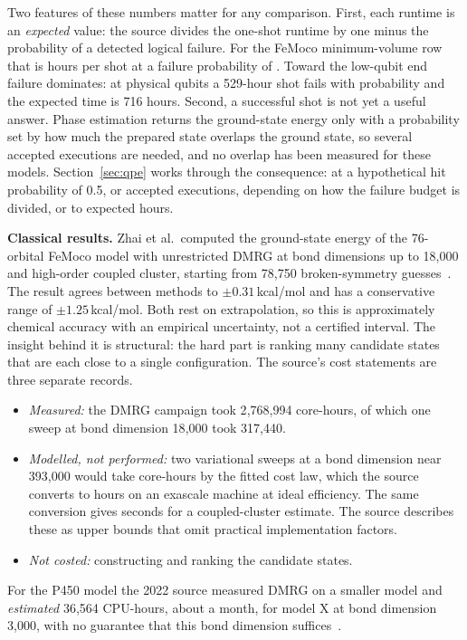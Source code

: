 

Two features of these numbers matter for any comparison. First, each runtime is an \emph{expected} value: the source divides the one-shot runtime by one minus the probability of a detected logical failure. For the FeMoco minimum-volume row that is \femoShot{} hours per shot at a failure probability of \femoPfail. Toward the low-qubit end failure dominates: at \femoSevLowQ{} physical qubits a 529-hour shot fails with probability \femoLowPfail{} and the expected time is 716 hours. Second, a successful shot is not yet a useful answer. Phase estimation returns the ground-state energy only with a probability set by how much the prepared state overlaps the ground state, so several accepted executions are needed, and no overlap has been measured for these models. Section~\ref{sec:qpe} works through the consequence: at a hypothetical hit probability of 0.5, \repAttempts{} or \repAttemptsSplit{} accepted executions, depending on how the failure budget is divided, or \repHours{} to \repHoursSplit{} expected hours.

\textbf{Classical results.} Zhai et al.\ computed the ground-state energy of the 76-orbital FeMoco model with unrestricted DMRG at bond dimensions up to 18{,}000 and high-order coupled cluster, starting from 78{,}750 broken-symmetry guesses~\cite{zhai2026}. The result agrees between methods to $\pm0.31$\,kcal/mol and has a conservative range of $\pm1.25$\,kcal/mol. Both rest on extrapolation, so this is approximately chemical accuracy with an empirical uncertainty, not a certified interval. The insight behind it is structural: the hard part is ranking many candidate states that are each close to a single configuration. The source's cost statements are three separate records.
\begin{itemize}
\item \emph{Measured:} the DMRG campaign took 2{,}768{,}994 core-hours, of which one sweep at bond dimension 18{,}000 took 317{,}440.
\item \emph{Modelled, not performed:} two variational sweeps at a bond dimension near 393{,}000 would take \femoClassCoreH{} core-hours by the fitted cost law, which the source converts to \femoClassIdeal{} hours on an exascale machine at ideal efficiency. The same conversion gives \femoUcc{} seconds for a coupled-cluster estimate. The source describes these as upper bounds that omit practical implementation factors.
\item \emph{Not costed:} constructing and ranking the candidate states.
\end{itemize}
For the P450 model the 2022 source measured DMRG on a smaller model and \emph{estimated} 36{,}564 CPU-hours, about a month, for model X at bond dimension 3{,}000, with no guarantee that this bond dimension suffices~\cite{goings2022}.

